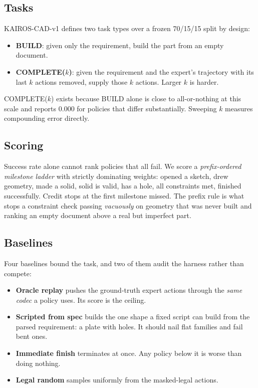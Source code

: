 \documentclass{article}
\begin{document}
\subsection{Tasks}

KAIROS-CAD-v1 defines two task types over a frozen 70/15/15 split by design:

\begin{itemize}\itemsep2pt
\item \textbf{BUILD}: given only the requirement, build the part from an empty
      document.
\item \textbf{COMPLETE($k$)}: given the requirement and the expert's trajectory
      with its last $k$ actions removed, supply those $k$ actions. Larger $k$ is
      harder.
\end{itemize}

COMPLETE($k$) exists because BUILD alone is close to all-or-nothing at this scale
and reports $0.000$ for policies that differ substantially. Sweeping $k$
measures compounding error directly.

\subsection{Scoring}

Success rate alone cannot rank policies that all fail. We score a
\emph{prefix-ordered milestone ladder} with strictly dominating weights: opened a
sketch, drew geometry, made a solid, solid is valid, has a hole, all constraints
met, finished successfully. Credit stops at the first milestone missed. The
prefix rule is what stops a constraint check passing \emph{vacuously} on geometry
that was never built and ranking an empty document above a real but imperfect
part.

\subsection{Baselines}

Four baselines bound the task, and two of them audit the harness rather than
compete:

\begin{itemize}\itemsep2pt
\item \textbf{Oracle replay} pushes the ground-truth expert actions through the
      \emph{same codec} a policy uses. Its score is the ceiling.
\item \textbf{Scripted from spec} builds the one shape a fixed script can build
      from the parsed requirement: a plate with holes. It should nail flat
      families and fail bent ones.
\item \textbf{Immediate finish} terminates at once. Any policy below it is worse
      than doing nothing.
\item \textbf{Legal random} samples uniformly from the masked-legal actions.
\end{itemize}
\end{document}
